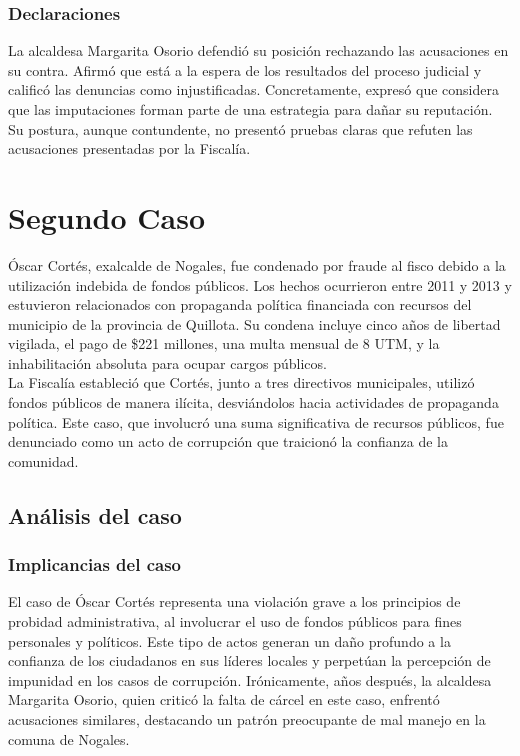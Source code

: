 \documentclass[letter,12pt]{article}
\begin{document}
	\subsubsection{Declaraciones}
	La alcaldesa Margarita Osorio defendió su posición rechazando las acusaciones en su contra. Afirmó que está a la espera de los resultados del proceso judicial y calificó las denuncias como injustificadas. Concretamente, expresó que considera que las imputaciones forman parte de una estrategia para dañar su reputación. Su postura, aunque contundente, no presentó pruebas claras que refuten las acusaciones presentadas por la Fiscalía.
	
	\section{Segundo Caso\\}
	Óscar Cortés, exalcalde de Nogales, fue condenado por fraude al fisco debido a la utilización indebida de fondos públicos. Los hechos ocurrieron entre 2011 y 2013 y estuvieron relacionados con propaganda política financiada con recursos del municipio de la provincia de Quillota. Su condena incluye cinco años de libertad vigilada, el pago de \$221 millones, una multa mensual de 8 UTM, y la inhabilitación absoluta para ocupar cargos públicos.\\
	La Fiscalía estableció que Cortés, junto a tres directivos municipales, utilizó fondos públicos de manera ilícita, desviándolos hacia actividades de propaganda política. Este caso, que involucró una suma significativa de recursos públicos, fue denunciado como un acto de corrupción que traicionó la confianza de la comunidad.\\
	
	\subsection{Análisis del caso\\}
	\subsubsection{Implicancias del caso}
	El caso de Óscar Cortés representa una violación grave a los principios de probidad administrativa, al involucrar el uso de fondos públicos para fines personales y políticos. Este tipo de actos generan un daño profundo a la confianza de los ciudadanos en sus líderes locales y perpetúan la percepción de impunidad en los casos de corrupción. Irónicamente, años después, la alcaldesa Margarita Osorio, quien criticó la falta de cárcel en este caso, enfrentó acusaciones similares, destacando un patrón preocupante de mal manejo en la comuna de Nogales.\\
	
\end{document}
